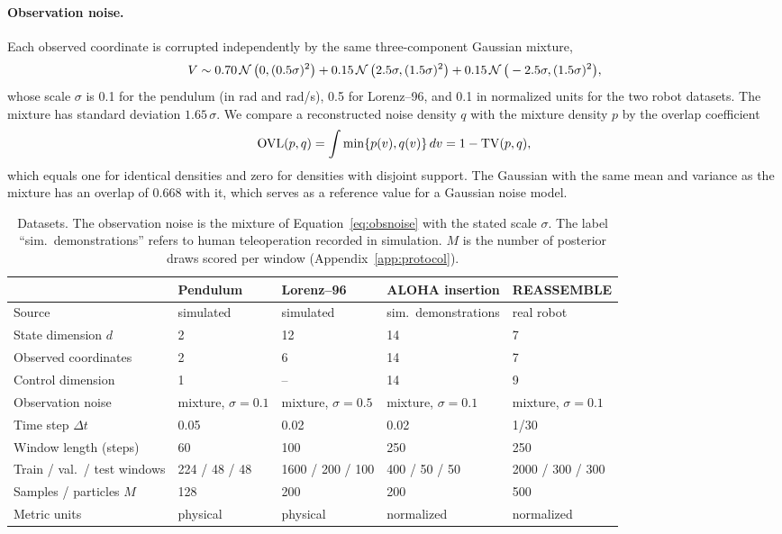 \paragraph{Observation noise.}
Each observed coordinate is corrupted independently by the same three-component Gaussian mixture,
\begin{equation}\label{eq:obsnoise}
 V\sim 0.70\,\mathcal N\,\big(0,(0.5\sigma)^2\big)+0.15\,\mathcal N\,\big(2.5\sigma,(1.5\sigma)^2\big)+0.15\,\mathcal N\,\big(-2.5\sigma,(1.5\sigma)^2\big),
\end{equation}
whose scale $\sigma$ is 0.1 for the pendulum (in rad and rad/s), 0.5 for Lorenz--96, and 0.1 in normalized units for the two robot datasets. The mixture has standard deviation $1.65\,\sigma$. We compare a reconstructed noise density $q$ with the mixture density $p$ by the overlap coefficient
\begin{equation}\label{eq:overlap}
 \mathrm{OVL}(p,q)=\int\min\{p(v),q(v)\}\,dv=1-\operatorname{TV}(p,q),
\end{equation}
which equals one for identical densities and zero for densities with disjoint support. The Gaussian with the same mean and variance as the mixture has an overlap of 0.668 with it, which serves as a reference value for a Gaussian noise model.

\begin{table}[t]
\centering\footnotesize
\begin{tabular}{lllll}
\toprule
 & Pendulum & Lorenz--96 & ALOHA insertion & REASSEMBLE \\
\midrule
Source & simulated & simulated & sim.\ demonstrations & real robot \\
State dimension $d$ & 2 & 12 & 14 & 7 \\
Observed coordinates & 2 & 6 & 14 & 7 \\
Control dimension & 1 & -- & 14 & 9 \\
Observation noise & mixture, $\sigma=0.1$ & mixture, $\sigma=0.5$ & mixture, $\sigma=0.1$ & mixture, $\sigma=0.1$ \\
Time step $\Delta t$ & 0.05 & 0.02 & 0.02 & 1/30 \\
Window length (steps) & 60 & 100 & 250 & 250 \\
Train / val.\ / test windows & 224 / 48 / 48 & 1600 / 200 / 100 & 400 / 50 / 50 & 2000 / 300 / 300 \\
Samples / particles $M$ & 128 & 200 & 200 & 500 \\
Metric units & physical & physical & normalized & normalized \\
\bottomrule
\end{tabular}
\caption{Datasets. The observation noise is the mixture of Equation~\eqref{eq:obsnoise} with the stated scale $\sigma$. The label ``sim.\ demonstrations'' refers to human teleoperation recorded in simulation. $M$ is the number of posterior draws scored per window (Appendix~\ref{app:protocol}).}
\label{tab:datasets}
\end{table}

